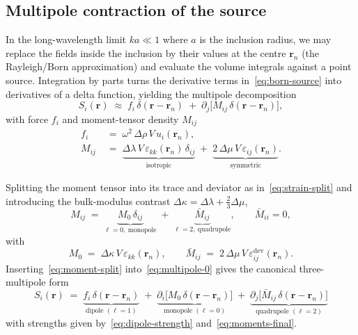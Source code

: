 \documentclass[11pt,a4paper]{article}
\newcommand{\eps}{\varepsilon}
\newcommand{\rrn}{\bm{r}_n}
\newcommand{\dev}{\mathrm{dev}}
\theoremstyle{plain}
\theoremstyle{definition}
\theoremstyle{remark}
\begin{document}
\subsection{Multipole contraction of the source}

In the long-wavelength limit $k a \ll 1$ where $a$ is the inclusion
radius, we may replace the fields inside the inclusion by their values
at the centre $\rrn$ (the Rayleigh/Born approximation) and evaluate the
volume integrals against a point source.  Integration by parts turns
the derivative terms in~\eqref{eq:born-source} into derivatives of a
delta function, yielding the multipole decomposition
\begin{equation}
  S_i(\bm{r})
  \;\approx\;
  f_i\,\delta(\bm{r}-\rrn)
  \;+\;
  \partial_j\!\bigl[M_{ij}\,\delta(\bm{r}-\rrn)\bigr],
  \label{eq:multipole-0}
\end{equation}
with force $f_i$ and moment-tensor density $M_{ij}$
\begin{align}
  f_i &\;=\; \omega^2\,\Delta\rho\,V\,u_i(\rrn),
  \label{eq:dipole-strength}\\[2pt]
  M_{ij}
  &\;=\;
    \underbrace{\Delta\lambda\,V\,\eps_{kk}(\rrn)\,\delta_{ij}}_{\text{isotropic}}
  \;+\;
    \underbrace{2\,\Delta\mu\,V\,\eps_{ij}(\rrn)}_{\text{symmetric}}.
  \label{eq:moment-density}
\end{align}

Splitting the moment tensor into its trace and deviator as
in~\eqref{eq:strain-split} and introducing the
bulk-modulus contrast $\Delta\kappa=\Delta\lambda+\tfrac{2}{3}\Delta\mu$,
\begin{equation}
  M_{ij}
  \;=\;
  \underbrace{M_0\,\delta_{ij}}_{\ell=0,\ \text{monopole}}
  \;+\;
  \underbrace{\bar{M}_{ij}}_{\ell=2,\ \text{quadrupole}},
  \qquad
  \bar{M}_{ii}=0,
  \label{eq:moment-split}
\end{equation}
with
\begin{equation}
  M_0 \;=\; \Delta\kappa\,V\,\eps_{kk}(\rrn),
  \qquad
  \bar{M}_{ij} \;=\; 2\,\Delta\mu\,V\,\eps_{ij}^{\dev}(\rrn).
  \label{eq:moments-final}
\end{equation}
Inserting~\eqref{eq:moment-split} into~\eqref{eq:multipole-0} gives the
canonical three-multipole form
\begin{equation}
  \boxed{
  \ S_i(\bm{r})
  \;=\;
  \underbrace{f_i\,\delta(\bm{r}-\rrn)}_{\text{dipole }(\ell=1)}
  \;+\;
  \underbrace{\partial_i\!\bigl[M_0\,\delta(\bm{r}-\rrn)\bigr]}_{\text{monopole }(\ell=0)}
  \;+\;
  \underbrace{\partial_j\!\bigl[\bar{M}_{ij}\,\delta(\bm{r}-\rrn)\bigr]}_{\text{quadrupole }(\ell=2)}\ }
  \label{eq:multipole-final}
\end{equation}
with strengths given by~\eqref{eq:dipole-strength}
and~\eqref{eq:moments-final}.
\end{document}
